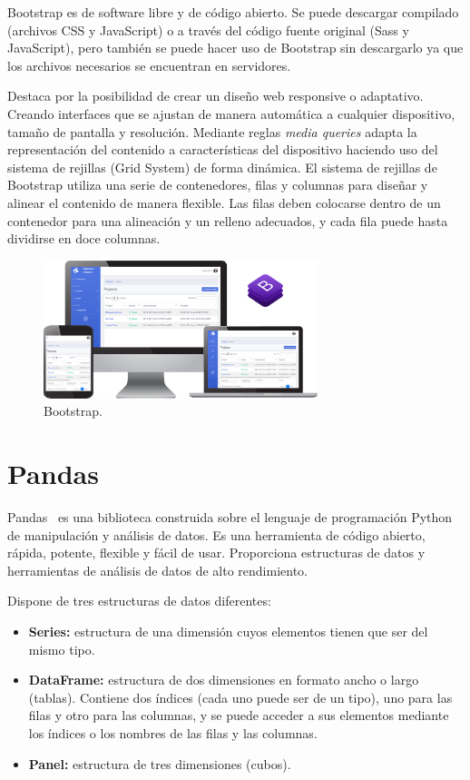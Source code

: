 \documentclass[a4paper, 12pt]{book}
\begin{document}
\vspace{5mm}
Bootstrap es de software libre y de código abierto.
Se puede descargar compilado (archivos CSS y JavaScript) o a través del código fuente original (Sass y JavaScript), pero también se puede hacer uso de Bootstrap sin descargarlo ya que los archivos necesarios se encuentran en servidores.

\vspace{5mm}%
Destaca por la posibilidad de crear un diseño web responsive o adaptativo.
Creando interfaces que se ajustan de manera automática a cualquier dispositivo, tamaño de pantalla y resolución.
Mediante reglas \textit{media queries} adapta la representación del contenido a características del dispositivo haciendo uso del sistema de rejillas (Grid System) de forma dinámica.
El sistema de rejillas de Bootstrap utiliza una serie de contenedores, filas y columnas para diseñar y alinear el contenido de manera flexible.
Las filas deben colocarse dentro de un contenedor para una alineación y un relleno adecuados, y cada fila puede hasta dividirse en doce columnas.

\begin{figure}[ht]
  \centering
  \includegraphics[width=8cm, keepaspectratio]{img/bootstrap.png}
  \caption{Bootstrap.}\label{fig:bootstrap}
\end{figure}


\section{Pandas} 
\label{sec:pandas}

Pandas~\cite{pandas} es una biblioteca construida sobre el lenguaje de programación Python de manipulación y análisis de datos.
Es una herramienta de código abierto, rápida, potente, flexible y fácil de usar.
Proporciona estructuras de datos y herramientas de análisis de datos de alto rendimiento.

\vspace{5mm}
Dispone de tres estructuras de datos diferentes:
\begin{itemize}
    \item \textbf{Series: } estructura de una dimensión cuyos elementos tienen que ser del mismo tipo.
    \item \textbf{DataFrame: } estructura de dos dimensiones en formato ancho o largo (tablas).
    Contiene dos índices (cada uno puede ser de un tipo), uno para las filas y otro para las columnas, y se puede acceder a sus elementos mediante los índices o los nombres de las filas y las columnas.
    \item \textbf{Panel: } estructura de tres dimensiones (cubos).
\end{itemize}
\end{document}
